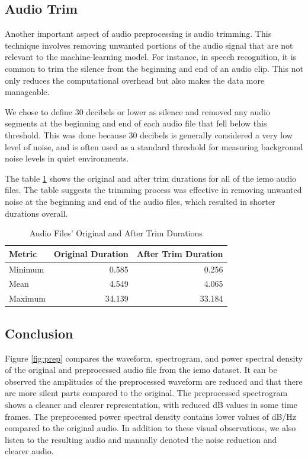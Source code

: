 \subsection{Audio Trim}

Another important aspect of audio preprocessing is audio trimming. This technique involves removing unwanted portions of the audio signal that are not relevant to the machine-learning model. For instance, in speech recognition, it is common to trim the silence from the beginning and end of an audio clip. This not only reduces the computational overhead but also makes the data more manageable.

We chose to define 30 decibels or lower as silence and removed any audio segments at the beginning and end of each audio file that fell below this threshold. This was done because 30 decibels is generally considered a very low level of noise, and is often used as a standard threshold for measuring background noise levels in quiet environments.

The table \ref{trim_durations} shows the original and after trim durations for all of the \ac{iemo} audio files. The table suggests the trimming process was effective in removing unwanted noise at the beginning and end of the audio files, which resulted in shorter durations overall. 


\begin{table}[H]
	\centering
	\caption{Audio Files' Original and After Trim Durations}
	\label{trim_durations}
	\begin{tabular}{lrr}
		\toprule
		Metric & Original Duration & After Trim Duration \\
		\midrule
		Minimum  		&  0.585 	&  0.256 \\
		Mean 			&  4.549  	&  4.065 \\
		Maximum 		& 34.139   	& 33.184 \\
		\bottomrule
	\end{tabular}
\end{table}



\subsection{Conclusion}

Figure \ref{fig:prep} compares the waveform, spectrogram, and power spectral density of the original and preprocessed audio file from the \ac{iemo} dataset. It can be observed the amplitudes of the preprocessed waveform are reduced and that there are more silent parts compared to the original. The preprocessed spectrogram shows a cleaner and clearer representation, with reduced dB values in some time frames. The preprocessed power spectral density contains lower values of dB/Hz compared to the original audio. In addition to these visual observations, we also listen to the resulting audio and manually denoted the noise reduction and clearer audio.

